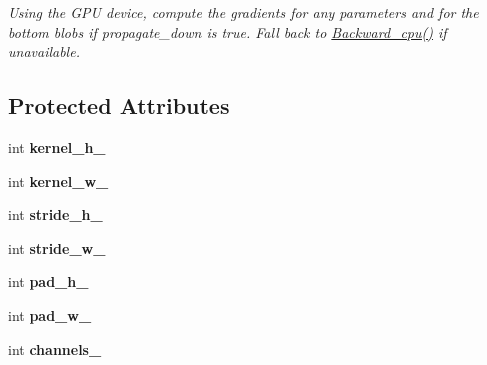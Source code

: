 \begin{DoxyCompactItemize}
\begin{DoxyCompactList}\small\item\em Using the G\+PU device, compute the gradients for any parameters and for the bottom blobs if propagate\+\_\+down is true. Fall back to \hyperlink{classcaffe_1_1PoolingLayer_a8d3cf138cdbd059a0bab72361f0860b5}{Backward\+\_\+cpu()} if unavailable. \end{DoxyCompactList}\end{DoxyCompactItemize}
\subsection*{Protected Attributes}
\begin{DoxyCompactItemize}
\item 
int {\bfseries kernel\+\_\+h\+\_\+}\hypertarget{classcaffe_1_1PoolingLayer_affc3a754fd0910fb0c682c2291fd3a1f}{}\label{classcaffe_1_1PoolingLayer_affc3a754fd0910fb0c682c2291fd3a1f}

\item 
int {\bfseries kernel\+\_\+w\+\_\+}\hypertarget{classcaffe_1_1PoolingLayer_a709f1f564cb0828f8bb53ddd60aad0f6}{}\label{classcaffe_1_1PoolingLayer_a709f1f564cb0828f8bb53ddd60aad0f6}

\item 
int {\bfseries stride\+\_\+h\+\_\+}\hypertarget{classcaffe_1_1PoolingLayer_a4bda6370083e3fcfc1327665b6da74dd}{}\label{classcaffe_1_1PoolingLayer_a4bda6370083e3fcfc1327665b6da74dd}

\item 
int {\bfseries stride\+\_\+w\+\_\+}\hypertarget{classcaffe_1_1PoolingLayer_aa1030df29e04665aa7e304f156f4faa2}{}\label{classcaffe_1_1PoolingLayer_aa1030df29e04665aa7e304f156f4faa2}

\item 
int {\bfseries pad\+\_\+h\+\_\+}\hypertarget{classcaffe_1_1PoolingLayer_a04d583e295eb3e5ee83fd260cd2af50d}{}\label{classcaffe_1_1PoolingLayer_a04d583e295eb3e5ee83fd260cd2af50d}

\item 
int {\bfseries pad\+\_\+w\+\_\+}\hypertarget{classcaffe_1_1PoolingLayer_ac379ddcd21b943a7ea9294b0375fae16}{}\label{classcaffe_1_1PoolingLayer_ac379ddcd21b943a7ea9294b0375fae16}

\item 
int {\bfseries channels\+\_\+}\hypertarget{classcaffe_1_1PoolingLayer_a9aaf4e65127d969b32b1a860dcb380f4}{}\label{classcaffe_1_1PoolingLayer_a9aaf4e65127d969b32b1a860dcb380f4}


\end{DoxyCompactItemize}
